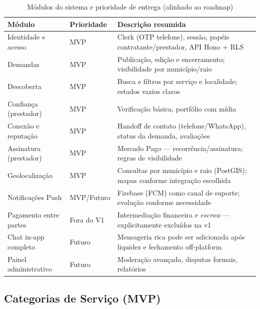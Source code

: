\documentclass[12pt, a4paper]{article}
\begin{document}
\begin{table}[H]
  \centering
  \caption{Módulos do sistema e prioridade de entrega (alinhado ao roadmap)}
  \label{tab:modulos}
  \begin{tabularx}{\textwidth}{%
    >{\raggedright\arraybackslash}p{4.2cm}
    >{\centering\arraybackslash}p{1.8cm}
    >{\raggedright\arraybackslash}X}
  \toprule
  \rowcolor{ifcGreen!20}
  \textbf{Módulo} & \textbf{Prioridade} & \textbf{Descrição resumida} \\
  \midrule
  Identidade e acesso       & MVP & Clerk (OTP telefone), sessão, papéis contratante/prestador, API Hono + RLS \\
  \rowcolor{rowGray}
  Demandas                  & MVP & Publicação, edição e encerramento; visibilidade por município/raio \\
  Descoberta                & MVP & Busca e filtros por serviço e localidade; estados vazios claros \\
  \rowcolor{rowGray}
  Confiança (prestador)     & MVP & Verificação básica, portfólio com mídia \\
  Conexão e reputação       & MVP & Handoff de contato (telefone/WhatsApp), status da demanda, avaliações \\
  \rowcolor{rowGray}
  Assinatura (prestador)    & MVP & Mercado Pago --- recorrência/assinatura; regras de visibilidade \\
  Geolocalização            & MVP & Consultas por município e raio (PostGIS); mapas conforme integração escolhida \\
  \rowcolor{rowGray}
  Notificações Push         & MVP/Futuro & Firebase (FCM) como canal de suporte; evolução conforme necessidade \\
  Pagamento entre partes    & Fora do V1 & Intermediação financeira e \textit{escrow} --- explicitamente excluídos na v1 \\
  \rowcolor{rowGray}
  Chat in-app completo      & Futuro & Mensageria rica pode ser adicionada após liquidez e fechamento off-platform \\
  Painel administrativo     & Futuro & Moderação avançada, disputas formais, relatórios \\
  \bottomrule
  \end{tabularx}
\end{table}

\subsection{Categorias de Serviço (MVP)}
\end{document}
